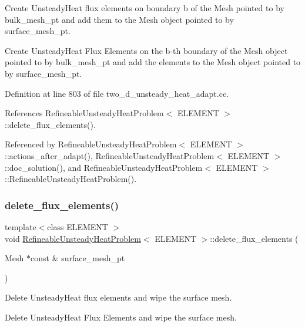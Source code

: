 Create Unsteady\+Heat flux elements on boundary b of the Mesh pointed to by bulk\+\_\+mesh\+\_\+pt and add them to the Mesh object pointed to by surface\+\_\+mesh\+\_\+pt. 

Create Unsteady\+Heat Flux Elements on the b-\/th boundary of the Mesh object pointed to by bulk\+\_\+mesh\+\_\+pt and add the elements to the Mesh object pointed to by surface\+\_\+mesh\+\_\+pt. 

Definition at line 803 of file two\+\_\+d\+\_\+unsteady\+\_\+heat\+\_\+adapt.\+cc.



References Refineable\+Unsteady\+Heat\+Problem$<$ E\+L\+E\+M\+E\+N\+T $>$\+::delete\+\_\+flux\+\_\+elements().



Referenced by Refineable\+Unsteady\+Heat\+Problem$<$ E\+L\+E\+M\+E\+N\+T $>$\+::actions\+\_\+after\+\_\+adapt(), Refineable\+Unsteady\+Heat\+Problem$<$ E\+L\+E\+M\+E\+N\+T $>$\+::doc\+\_\+solution(), and Refineable\+Unsteady\+Heat\+Problem$<$ E\+L\+E\+M\+E\+N\+T $>$\+::\+Refineable\+Unsteady\+Heat\+Problem().

\mbox{\label{classRefineableUnsteadyHeatProblem_ad2e53af5c385e44e33e400b430b610e8}} 
\subsubsection{\texorpdfstring{delete\+\_\+flux\+\_\+elements()}{delete\_flux\_elements()}}
{\footnotesize\ttfamily template$<$class E\+L\+E\+M\+E\+NT $>$ \\
void \hyperlink{classRefineableUnsteadyHeatProblem}{Refineable\+Unsteady\+Heat\+Problem}$<$ E\+L\+E\+M\+E\+NT $>$\+::delete\+\_\+flux\+\_\+elements (\begin{DoxyParamCaption}\item[{Mesh $\ast$const \&}]{surface\+\_\+mesh\+\_\+pt }\end{DoxyParamCaption})}



Delete Unsteady\+Heat flux elements and wipe the surface mesh. 

Delete Unsteady\+Heat Flux Elements and wipe the surface mesh. 

